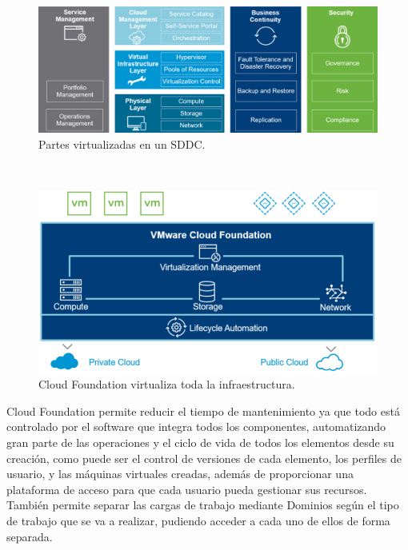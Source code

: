 \begin{figure}[h!]
  \centering
  \includegraphics[width=1\textwidth]{imaxes/cap2recursos/SDDCoverview.png}
  \caption{Partes virtualizadas en un SDDC.}
  \label{fig:sddcoverview}
\end{figure}
\\
\begin{figure}[h!]
  \centering
  \includegraphics[width=1\textwidth]{imaxes/cap2recursos/overviewCF.png}
  \caption{Cloud Foundation virtualiza toda la infraestructura.}
  \label{fig:infraCloudFound}
\end{figure}

Cloud Foundation permite reducir el tiempo de mantenimiento ya que todo está controlado por el software que integra todos los componentes, automatizando gran parte de las operaciones y el ciclo de vida de todos los elementos desde su creación, como puede ser el control de versiones de cada elemento, los perfiles de usuario, y las máquinas virtuales creadas, además de proporcionar una plataforma de acceso para que cada usuario pueda gestionar sus recursos.
También permite separar las cargas de trabajo mediante Dominios según el tipo de trabajo que se va a realizar, pudiendo acceder a cada uno de ellos de forma separada.





